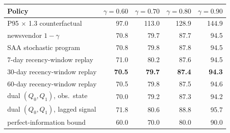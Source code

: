 \setlength{\tabcolsep}{4pt}
\begin{tabular}{@{}l r r r r @{}}
\toprule
Policy & $\gamma{=}0.60$ & $\gamma{=}0.70$ & $\gamma{=}0.80$ & $\gamma{=}0.90$ \\
\midrule
P95 $\times$ 1.3 counterfactual & 97.0 & 113.0 & 128.9 & 144.9 \\
newsvendor $1{-}\gamma$ & 70.8 & 79.7 & 87.7 & 94.5 \\
SAA stochastic program & 70.8 & 79.8 & 87.8 & 94.5 \\
7-day recency-window replay & 71.0 & 80.2 & 87.6 & 94.5 \\
30-day recency-window replay & \textbf{70.5} & \textbf{79.7} & \textbf{87.4} & \textbf{94.3} \\
60-day recency-window replay & 70.5 & 79.8 & 87.5 & 94.6 \\
dual $(Q_0,Q_1)$, obs.\ state & 70.0 & 79.2 & 87.3 & 94.2 \\
dual $(Q_0,Q_1)$, lagged signal & 71.8 & 80.6 & 88.8 & 95.7 \\
perfect-information bound & 60.0 & 70.0 & 80.0 & 90.0 \\
\bottomrule
\end{tabular}
